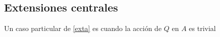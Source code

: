 \subsection{Extensiones centrales}

Un caso particular de \eqref{exta} es cuando la acción de $Q$ en $A$ es trivial